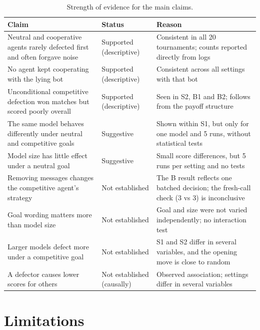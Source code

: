 \documentclass[11pt,a4paper]{article}
\begin{document}
\begin{table}[htbp]
\centering
\caption{Strength of evidence for the main claims.}
\label{tab:claims}
\small
\begin{tabularx}{\textwidth}{@{}LlL@{}}
\toprule
Claim & Status & Reason \\
\midrule
Neutral and cooperative agents rarely defected first and often forgave noise & Supported (descriptive) & Consistent in all 20 tournaments; counts reported directly from logs \\
No agent kept cooperating with the lying bot & Supported (descriptive) & Consistent across all settings with that bot \\
Unconditional competitive defection won matches but scored poorly overall & Supported (descriptive) & Seen in S2, B1 and B2; follows from the payoff structure \\
\addlinespace
The same model behaves differently under neutral and competitive goals & Suggestive & Shown within S1, but only for one model and 5 runs, without statistical tests \\
Model size has little effect under a neutral goal & Suggestive & Small score differences, but 5 runs per setting and no tests \\
Removing messages changes the competitive agent's strategy & Not established & The B result reflects one batched decision; the fresh-call check (3 vs 3) is inconclusive \\
\addlinespace
Goal wording matters more than model size & Not established & Goal and size were not varied independently; no interaction test \\
Larger models defect more under a competitive goal & Not established & S1 and S2 differ in several variables, and the opening move is close to random \\
A defector causes lower scores for others & Not established (causally) & Observed association; settings differ in several variables \\
\bottomrule
\end{tabularx}
\end{table}

\section{Limitations}
\end{document}
